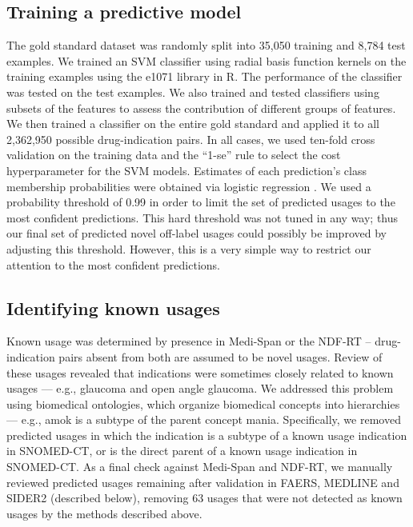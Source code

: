 \subsection{Training a predictive model}
The gold standard dataset was randomly split into 35,050 training and
8,784 test examples.  We trained an SVM classifier using radial basis
function kernels on the training examples using the e1071 library in
R.  The performance of the classifier was tested on the test examples.
We also trained and tested classifiers using subsets of the features
to assess the contribution of different groups of features.  We then
trained a classifier on the entire gold standard and applied it to all
2,362,950 possible drug-indication pairs.  In all cases, we used
ten-fold cross validation on the training data and the “1-se” rule to
select the cost hyperparameter for the SVM models.  Estimates of each
prediction’s class membership probabilities were obtained via logistic
regression \cite{Platt1999}.  We used a probability threshold of 0.99
in order to limit the set of predicted usages to the most confident
predictions.  This hard threshold was not tuned in any way; thus our
final set of predicted novel off-label usages could possibly be
improved by adjusting this threshold.  However, this is a very simple
way to restrict our attention to the most confident predictions.

\subsection{Identifying known usages}
Known usage was determined by presence in Medi-Span or the NDF-RT –
drug-indication pairs absent from both are assumed to be novel usages.
Review of these usages revealed that indications were sometimes
closely related to known usages — e.g., glaucoma and open angle
glaucoma.  We addressed this problem using biomedical ontologies,
which organize biomedical concepts into hierarchies — e.g., amok is a
subtype of the parent concept mania.  Specifically, we removed
predicted usages in which the indication is a subtype of a known usage
indication in SNOMED-CT, or is the direct parent of a known usage
indication in SNOMED-CT.  As a final check against Medi-Span and
NDF-RT, we manually reviewed predicted usages remaining after
validation in FAERS, MEDLINE and SIDER2 (described below), removing 63
usages that were not detected as known usages by the methods described
above.

